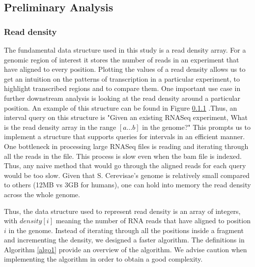 \documentclass[12pt]{article}
\begin{document}


\subsection{Preliminary Analysis}
\subsubsection{Read density}\label{density}
The fundamental data structure used in this study is a read density array. For a genomic region of interest it stores the number of reads in an experiment that have aligned to every position. Plotting the values of a read density allows us to get an intuition on the patterns of transcription in a particular experiment, to highlight transcribed regions and to compare them. One important use case in further downstream analysis is looking at the read density around a particular position. An example of this structure can be found in Figure \ref{density} .Thus, an interval query on this structure is "Given an existing RNASeq experiment, What is the read density array in the range $[a...b]$ in the genome?" 
This prompts us to implement a structure that supports queries for intervals in an efficient manner. One bottleneck in processing large RNASeq files is reading and iterating through all the reads in the file. This process is slow even when the bam file is indexed. Thus, any naive method that would go through the aligned reads for each query would be too slow. Given that S. Cerevisae's genome is relatively small compared to others (12MB vs 3GB for humans), one can hold into memory the read density across the whole genome.

Thus, the data structure used to represent read density is an array of integers, with $density[i]$ meaning the number of RNA reads that have aligned to position $i$ in the genome. Instead of iterating through all the positions inside a fragment and incrementing the density, we designed a faster algorithm. The definitions in Algorithm \ref{algo1} provide an overview of the algorithm. We advise caution when implementing the algorithm in order to obtain a good complexity.




\end{document}
